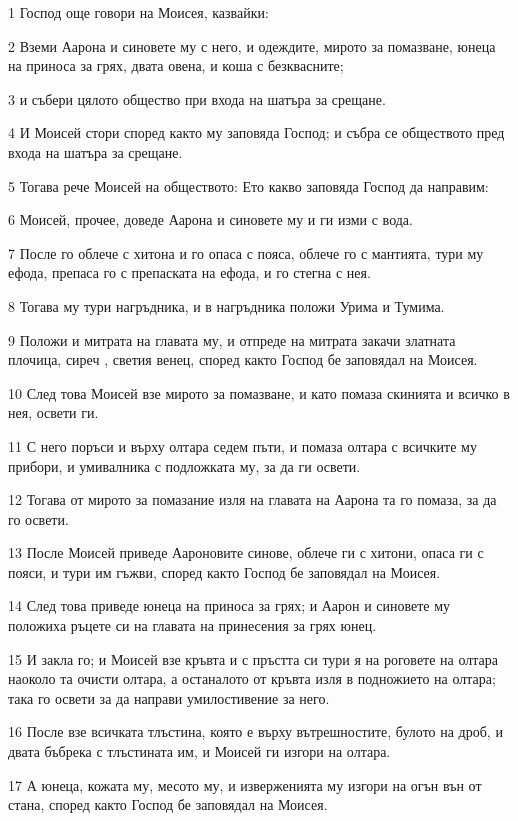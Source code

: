 \par 1 Господ още говори на Моисея, казвайки:
\par 2 Вземи Аарона и синовете му с него, и одеждите, мирото за помазване, юнеца на приноса за грях, двата овена, и коша с безквасните;
\par 3 и събери цялото общество при входа на шатъра за срещане.
\par 4 И Моисей стори според както му заповяда Господ; и събра се обществото пред входа на шатъра за срещане.
\par 5 Тогава рече Моисей на обществото: Ето какво заповяда Господ да направим:
\par 6 Моисей, прочее, доведе Аарона и синовете му и ги изми с вода.
\par 7 После го облече с хитона и го опаса с пояса, облече го с мантията, тури му ефода, препаса го с препаската на ефода, и го стегна с нея.
\par 8 Тогава му тури нагръдника, и в нагръдника положи Урима и Тумима.
\par 9 Положи и митрата на главата му, и отпреде на митрата закачи златната плочица, сиреч , светия венец, според както Господ бе заповядал на Моисея.
\par 10 След това Моисей взе мирото за помазване, и като помаза скинията и всичко в нея, освети ги.
\par 11 С него поръси и върху олтара седем пъти, и помаза олтара с всичките му прибори, и умивалника с подложката му, за да ги освети.
\par 12 Тогава от мирото за помазание изля на главата на Аарона та го помаза, за да го освети.
\par 13 После Моисей приведе Аароновите синове, облече ги с хитони, опаса ги с пояси, и тури им гъжви, според както Господ бе заповядал на Моисея.
\par 14 След това приведе юнеца на приноса за грях; и Аарон и синовете му положиха ръцете си на главата на принесения за грях юнец.
\par 15 И закла го; и Моисей взе кръвта и с пръстта си тури я на роговете на олтара наоколо та очисти олтара, а останалото от кръвта изля в подножието на олтара; така го освети за да направи умилостивение за него.
\par 16 После взе всичката тлъстина, която е върху вътрешностите, булото на дроб, и двата бъбрека с тлъстината им, и Моисей ги изгори на олтара.
\par 17 А юнеца, кожата му, месото му, и изверженията му изгори на огън вън от стана, според както Господ бе заповядал на Моисея.

